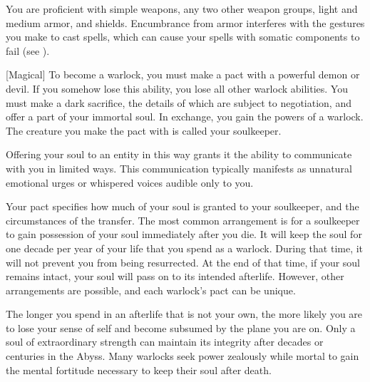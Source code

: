         You are proficient with simple weapons, any two other weapon groups, light and medium armor, and shields.
        Encumbrance from armor interferes with the gestures you make to cast spells, which can cause your spells with somatic components to fail (see ).

        [Magical]
        To become a warlock, you must make a pact with a powerful demon or devil.
        If you somehow lose this ability, you lose all other warlock abilities.
        You must make a dark sacrifice, the details of which are subject to negotiation, and offer a part of your immortal soul.
        In exchange, you gain the powers of a warlock.
        The creature you make the pact with is called your soulkeeper.

        Offering your soul to an entity in this way grants it the ability to communicate with you in limited ways.
        This communication typically manifests as unnatural emotional urges or whispered voices audible only to you.

        Your pact specifies how much of your soul is granted to your soulkeeper, and the circumstances of the transfer.
        The most common arrangement is for a soulkeeper to gain possession of your soul immediately after you die.
        It will keep the soul for one decade per year of your life that you spend as a warlock.
        During that time, it will not prevent you from being resurrected.
        At the end of that time, if your soul remains intact, your soul will pass on to its intended afterlife.
        However, other arrangements are possible, and each warlock's pact can be unique.

        The longer you spend in an afterlife that is not your own, the more likely you are to lose your sense of self and become subsumed by the plane you are on.
        Only a soul of extraordinary strength can maintain its integrity after decades or centuries in the Abyss.
        Many warlocks seek power zealously while mortal to gain the mental fortitude necessary to keep their soul after death.

